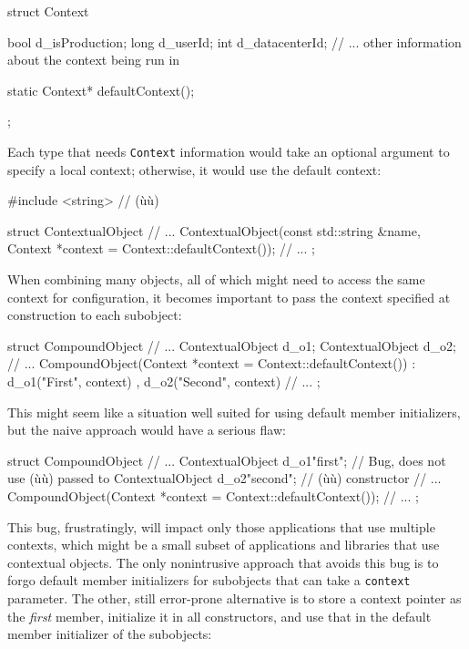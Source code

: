 \begin{emcppslisting}
struct Context
{
    bool d_isProduction;
    long d_userId;
    int  d_datacenterId;
    // ... other information about the context being run in

    static Context* defaultContext();
};
\end{emcppslisting}
    

Each type that needs \lstinline!Context! information would take an optional
argument to specify a local context; otherwise, it would use the default
context:

\begin{emcppslisting}
#include <string>  // (ù{}ù)

struct ContextualObject
{
// ...
     ContextualObject(const std::string &name,
                      Context *context = Context::defaultContext());
// ...
};
\end{emcppslisting}
    

When combining many objects, all of which might need to access the same
context for configuration, it becomes important to pass the context
specified at construction to each subobject:

\begin{emcppslisting}
struct CompoundObject
{
// ...
    ContextualObject d_o1;
    ContextualObject d_o2;
// ...
    CompoundObject(Context *context = Context::defaultContext())
    : d_o1("First", context)
    , d_o2("Second", context)
    { }
// ...
};
\end{emcppslisting}
    

This might seem like a situation well suited for using default member
initializers, but the naive approach would have a serious flaw:

\begin{emcppslisting}
struct CompoundObject
{
// ...
    ContextualObject d_o1{"first"};   // Bug, does not use (ù{}ù) passed to
    ContextualObject d_o2{"second"};  // (ù{}ù) constructor
// ...
    CompoundObject(Context *context = Context::defaultContext());
// ...
};
\end{emcppslisting}
    

This bug, frustratingly, will impact only those applications that use
multiple contexts, which might be a small subset of applications and
libraries that use contextual objects. The only nonintrusive approach
that avoids this bug is to forgo default member initializers for
subobjects that can take a \lstinline!context! parameter. The other, still
error-prone alternative is to store a context pointer as the
\emph{first} member, initialize it in all constructors, and use that in
the default member initializer of the subobjects:


